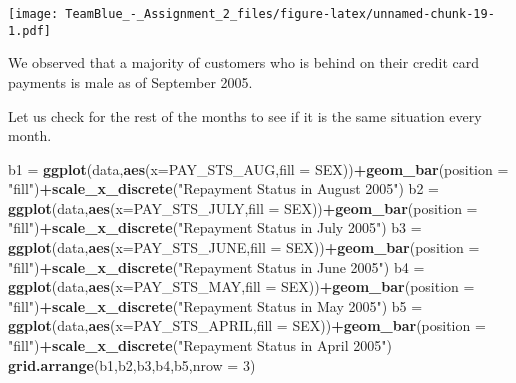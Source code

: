 \documentclass[]{article}
\newenvironment{Shaded}{\begin{snugshade}}{\end{snugshade}}
\newcommand{\KeywordTok}[1]{\textcolor[rgb]{0.13,0.29,0.53}{\textbf{#1}}}
\newcommand{\DataTypeTok}[1]{\textcolor[rgb]{0.13,0.29,0.53}{#1}}
\newcommand{\DecValTok}[1]{\textcolor[rgb]{0.00,0.00,0.81}{#1}}
\newcommand{\StringTok}[1]{\textcolor[rgb]{0.31,0.60,0.02}{#1}}
\newcommand{\OperatorTok}[1]{\textcolor[rgb]{0.81,0.36,0.00}{\textbf{#1}}}
\newcommand{\NormalTok}[1]{#1}
\begin{document}
\texttt{[image: TeamBlue\_-\_Assignment\_2\_files/figure-latex/unnamed-chunk-19-1.pdf]}

We observed that a majority of customers who is behind on their credit
card payments is male as of September 2005.

Let us check for the rest of the months to see if it is the same
situation every month.

\begin{Shaded}
\begin{Highlighting}[]
\NormalTok{b1 =}\StringTok{ }\KeywordTok{ggplot}\NormalTok{(data,}\KeywordTok{aes}\NormalTok{(}\DataTypeTok{x=}\NormalTok{PAY_STS_AUG,}\DataTypeTok{fill =}\NormalTok{ SEX))}\OperatorTok{+}\KeywordTok{geom_bar}\NormalTok{(}\DataTypeTok{position =} \StringTok{"fill"}\NormalTok{)}\OperatorTok{+}\KeywordTok{scale_x_discrete}\NormalTok{(}\StringTok{"Repayment Status in August 2005"}\NormalTok{)}
\NormalTok{b2 =}\StringTok{ }\KeywordTok{ggplot}\NormalTok{(data,}\KeywordTok{aes}\NormalTok{(}\DataTypeTok{x=}\NormalTok{PAY_STS_JULY,}\DataTypeTok{fill =}\NormalTok{ SEX))}\OperatorTok{+}\KeywordTok{geom_bar}\NormalTok{(}\DataTypeTok{position =} \StringTok{"fill"}\NormalTok{)}\OperatorTok{+}\KeywordTok{scale_x_discrete}\NormalTok{(}\StringTok{"Repayment Status in July 2005"}\NormalTok{)}
\NormalTok{b3 =}\StringTok{ }\KeywordTok{ggplot}\NormalTok{(data,}\KeywordTok{aes}\NormalTok{(}\DataTypeTok{x=}\NormalTok{PAY_STS_JUNE,}\DataTypeTok{fill =}\NormalTok{ SEX))}\OperatorTok{+}\KeywordTok{geom_bar}\NormalTok{(}\DataTypeTok{position =} \StringTok{"fill"}\NormalTok{)}\OperatorTok{+}\KeywordTok{scale_x_discrete}\NormalTok{(}\StringTok{"Repayment Status in June 2005"}\NormalTok{)}
\NormalTok{b4 =}\StringTok{ }\KeywordTok{ggplot}\NormalTok{(data,}\KeywordTok{aes}\NormalTok{(}\DataTypeTok{x=}\NormalTok{PAY_STS_MAY,}\DataTypeTok{fill =}\NormalTok{ SEX))}\OperatorTok{+}\KeywordTok{geom_bar}\NormalTok{(}\DataTypeTok{position =} \StringTok{"fill"}\NormalTok{)}\OperatorTok{+}\KeywordTok{scale_x_discrete}\NormalTok{(}\StringTok{"Repayment Status in May 2005"}\NormalTok{)}
\NormalTok{b5 =}\StringTok{ }\KeywordTok{ggplot}\NormalTok{(data,}\KeywordTok{aes}\NormalTok{(}\DataTypeTok{x=}\NormalTok{PAY_STS_APRIL,}\DataTypeTok{fill =}\NormalTok{ SEX))}\OperatorTok{+}\KeywordTok{geom_bar}\NormalTok{(}\DataTypeTok{position =} \StringTok{"fill"}\NormalTok{)}\OperatorTok{+}\KeywordTok{scale_x_discrete}\NormalTok{(}\StringTok{"Repayment Status in April 2005"}\NormalTok{)}
\KeywordTok{grid.arrange}\NormalTok{(b1,b2,b3,b4,b5,}\DataTypeTok{nrow =} \DecValTok{3}\NormalTok{)}
\end{Highlighting}
\end{Shaded}
\end{document}
